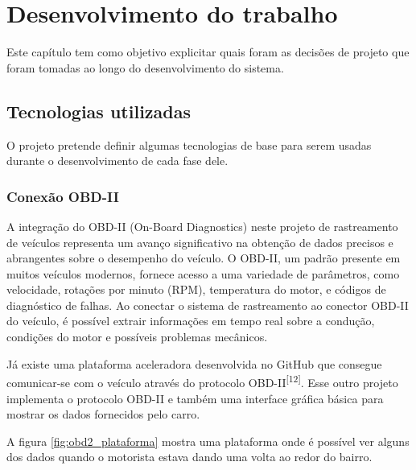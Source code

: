 \chapter{Desenvolvimento do trabalho}


Este capítulo tem como objetivo explicitar quais foram as decisões de projeto que foram tomadas ao longo do desenvolvimento do sistema.

\section{Tecnologias utilizadas}
O projeto pretende definir algumas tecnologias de base para serem usadas durante o desenvolvimento de cada fase dele.

    \subsection{Conexão OBD-II}
A integração do OBD-II (On-Board Diagnostics) neste projeto de rastreamento de veículos representa um avanço significativo na obtenção de dados precisos e abrangentes sobre o desempenho do veículo. O OBD-II, um padrão presente em muitos veículos modernos, fornece acesso a uma variedade de parâmetros, como velocidade, rotações por minuto (RPM), temperatura do motor, e códigos de diagnóstico de falhas. Ao conectar o sistema de rastreamento ao conector OBD-II do veículo, é possível extrair informações em tempo real sobre a condução, condições do motor e possíveis problemas mecânicos.

Já existe uma plataforma aceleradora desenvolvida no GitHub que consegue
comunicar-se com o veículo através do protocolo OBD-II\textsuperscript{[12]}. Esse outro projeto
implementa o protocolo OBD-II e também uma interface gráfica básica para mostrar
os dados fornecidos pelo carro.

A figura \ref{fig:obd2_plataforma} mostra uma plataforma onde é possível ver alguns dos dados quando o motorista estava dando uma volta ao redor do bairro.


